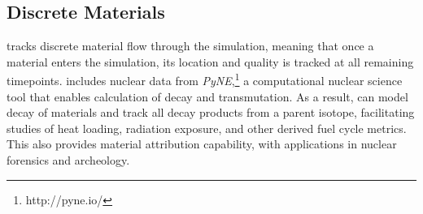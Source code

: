 \subsection{Discrete Materials}
\Cyclus tracks discrete material flow through the simulation, meaning that once a material enters the simulation, its location and quality is tracked at all remaining timepoints\cite{huff_integrated:_2013}.  \Cyclus includes nuclear data from \emph{PyNE},\footnote{http://pyne.io/} a computational nuclear science tool that enables calculation of decay and transmutation\cite{Scopatz2012b}. As a result, \Cyclus can  model decay of materials and track all decay products from a parent isotope, facilitating studies of heat loading, radiation exposure, and other derived fuel cycle metrics\cite{scopatz_cymetric_2015}. This also provides material attribution capability, with applications in nuclear forensics and archeology.
